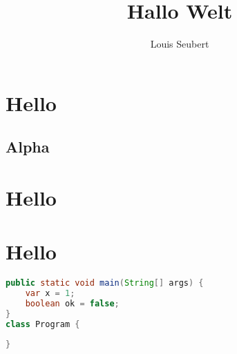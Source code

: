 \documentclass[11pt,a4paper,sans]{assingment}
\title{Hallo Welt}
\author{Louis Seubert}
\begin{document}



\maketitle
\tableofcontents

\newpage


\section{Hello}
\subsection{Alpha}
\newpage
\section{Hello}
\newpage
\section{Hello}

\begin{lstlisting}[language=java]
public static void main(String[] args) {
    var x = 1;
    boolean ok = false;
}
class Program {
    
}
\end{lstlisting}
\vfill
\end{document}
